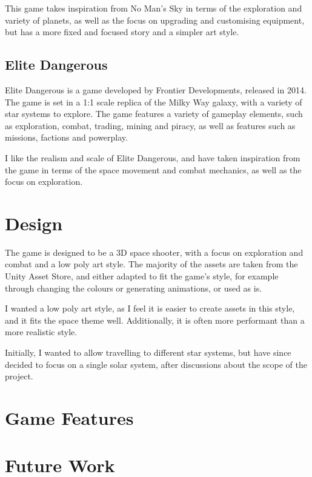 \documentclass[final]{cmpreport}
\begin{document}
    This game takes inspiration from No Man's Sky in terms of the exploration and variety of planets, as well as the
    focus on upgrading and customising equipment, but has a more fixed and focused story and a simpler art style.

    \subsection{Elite Dangerous}\label{subsec:ed}

    Elite Dangerous is a game developed by Frontier Developments\citep{frontier:ed}, released in 2014.
    The game is set in a 1:1 scale replica of the Milky Way galaxy, with a variety of star systems to explore.
    The game features a variety of gameplay elements, such as exploration, combat, trading, mining and piracy, as well
    as features such as missions, factions and powerplay.

    I like the realism and scale of Elite Dangerous, and have taken inspiration from the game in terms of the space
    movement and combat mechanics, as well as the focus on exploration.

    \section{Design}\label{sec:design}

    The game is designed to be a 3D space shooter, with a focus on exploration and combat and a low poly art style.
    The majority of the assets are taken from the Unity Asset Store\citep{unity:assetstore}, and either adapted to fit
    the game's style, for example through changing the colours or generating animations, or used as is.

    I wanted a low poly art style, as I feel it is easier to create assets in this style, and it fits the space theme
    well.
    Additionally, it is often more performant than a more realistic style.

    Initially, I wanted to allow travelling to different star systems, but have since decided to focus on a single solar
    system, after discussions about the scope of the project.

    \section{Game Features}\label{sec:features}

    

    \section{Future Work}\label{sec:future}
\end{document}
